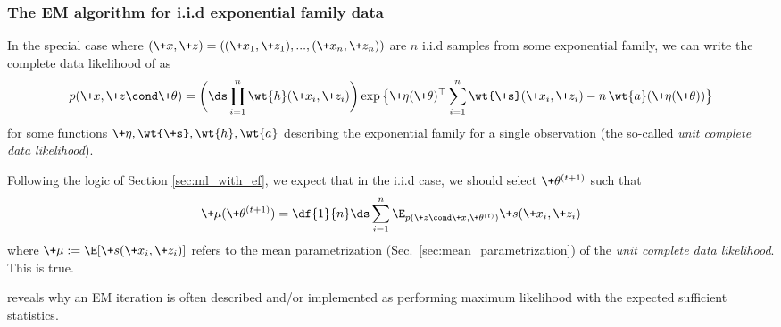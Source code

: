 \documentclass{article} %
\newcommand{\obs}{\+x}
\newcommand{\sufficientStatsFunction}{\+s}
\newcommand{\carrierDensity}{h}
\newcommand{\meanParam}{\+\mu}
\newcommand{\param}{\+\theta}
\newcommand{\naturalParam}{\+\eta}
\newcommand{\logNormalizerFunctionForSingleSample}{\wt{a}}
\newcommand{\sufficientStatsFunctionForSingleSample}{\wt{\sufficientStatsFunction}}
\newcommand{\carrierDensityForSingleSample}{\wt{\carrierDensity}}
\begin{document}
 

\subsubsection{The EM algorithm for i.i.d exponential family data}

In the special case where $(\obs, \+z)=((\obs_1,\+z_1), ..., (\obs_n, \+z_n))$ are $n$ i.i.d samples from some exponential family, we can write the complete data likelihood of  as 
%
\begin{align}
 p(\obs, \+z \cond \param) = \bigg( \ds\prod_{i=1}^n \carrierDensityForSingleSample(\obs_i, \+z_i) \bigg) \exp \big\{ \naturalParam(\param)^\top \sum_{i=1}^n \sufficientStatsFunctionForSingleSample(\obs_i, \+z_i) - n \,\logNormalizerFunctionForSingleSample(\naturalParam(\param))\big\} 
\label{eqn:exponential_family_complete_data_likelihood_based_on_iid_draws}
 \end{align}
%
for some functions $ \naturalParam, \sufficientStatsFunctionForSingleSample, \carrierDensityForSingleSample,\logNormalizerFunctionForSingleSample$ describing the exponential family for a single observation (the so-called \textit{unit complete data likelihood}). 

Following the logic of Section \ref{sec:ml_with_ef}, we expect that in the i.i.d case, we should select $\param^{(t+1)}$ such that
%
\begin{align}
\meanParam(\param^{(t+1)}) = \df{1}{n} \ds\sum_{i=1}^n   \E_{p(\+z \cond \+x , \param^{(t)})} \sufficientStatsFunction(\obs_i, \+z_i) 
\label{eqn:EM_iteration_as_maximum_likelihood_with_expected_sufficient_statistics}	
\end{align}
%
where $\meanParam := \E[\sufficientStatsFunction(\obs_i,\+z_i)]$ refers to the mean parametrization (Sec.~\ref{sec:mean_parametrization}) of the \textit{unit complete data likelihood}.  This is true.    

	 reveals why an EM iteration is often described and/or implemented as performing maximum likelihood with the expected sufficient statistics.

\end{document}
